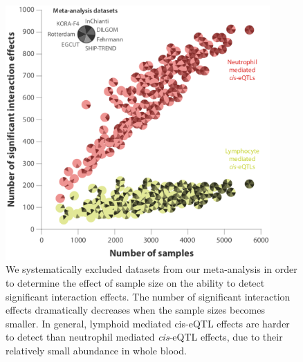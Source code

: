   \begin{figure}[h!]
  \centering
  \includegraphics[width=0.9\textwidth]{eps/image_4_5.eps}
  \caption[Validation]{We systematically excluded datasets from our meta-analysis in order to determine the effect 
                       of sample size on the ability to detect significant interaction effects. The number of 
                       significant interaction effects dramatically decreases when the sample sizes becomes smaller. 
                       In general, lymphoid mediated cis-eQTL effects are harder to detect than neutrophil mediated 
                       \emph{cis}-eQTL effects, due to their relatively small abundance in whole blood.  }
          \label{fig:fig4_5}
  \end{figure}

